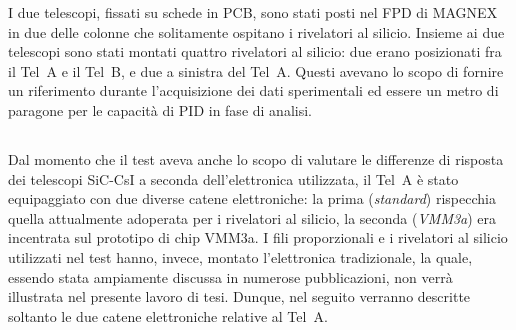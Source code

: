I due telescopi, fissati su schede in PCB, sono stati posti nel FPD di MAGNEX in due delle colonne che solitamente ospitano i rivelatori al silicio.
Insieme ai due telescopi sono stati montati quattro rivelatori al silicio: due erano posizionati fra il Tel~A e il Tel~B, e due a sinistra del Tel~A.
Questi avevano lo scopo di fornire un riferimento durante l'acquisizione dei dati sperimentali ed essere un metro di paragone per le capacità di PID in fase di analisi.









\subsection{}


Dal momento che il test aveva anche lo scopo di valutare le differenze di risposta dei telescopi SiC-CsI a seconda dell'elettronica utilizzata, il Tel~A è stato equipaggiato con due diverse catene elettroniche:
la prima (\emph{standard}) rispecchia quella attualmente adoperata per i rivelatori al silicio, la seconda (\emph{VMM3a}) era incentrata sul prototipo di chip VMM3a.
I fili proporzionali e i rivelatori al silicio utilizzati nel test hanno, invece, montato l'elettronica tradizionale, la quale, essendo stata ampiamente discussa in numerose pubblicazioni, non verrà illustrata nel presente lavoro di tesi.
Dunque, nel seguito verranno descritte soltanto le due catene elettroniche relative al Tel~A.


